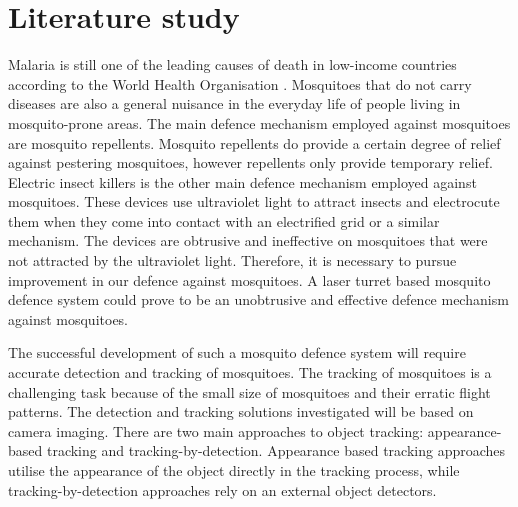 
\section{Literature study}

Malaria is still one of the leading causes of death in low-income countries according to the World Health Organisation \cite{WHO2020}. Mosquitoes that do not carry diseases are also a general nuisance in the everyday life of people living in mosquito-prone areas. The main defence mechanism employed against mosquitoes are mosquito repellents. Mosquito repellents do provide a certain degree of relief against pestering mosquitoes, however repellents only provide temporary relief. Electric insect killers is the other main defence mechanism employed against mosquitoes. These devices use ultraviolet light to attract insects and electrocute them when they come into contact with an electrified grid or a similar mechanism. The devices are obtrusive and ineffective on mosquitoes that were not attracted by the ultraviolet light. Therefore, it is necessary to pursue improvement in our defence against mosquitoes. A laser turret based mosquito defence system could prove to be an unobtrusive and effective defence mechanism against mosquitoes.

The successful development of such a mosquito defence system will require accurate detection and tracking of mosquitoes. The tracking of mosquitoes is a challenging task because of the small size of mosquitoes and their erratic flight patterns. The detection and tracking solutions investigated will be based on camera imaging. There are two main approaches to object tracking: appearance-based tracking and tracking-by-detection. Appearance based tracking approaches utilise the appearance of the object directly in the tracking process, while tracking-by-detection approaches rely on an external object detectors.

